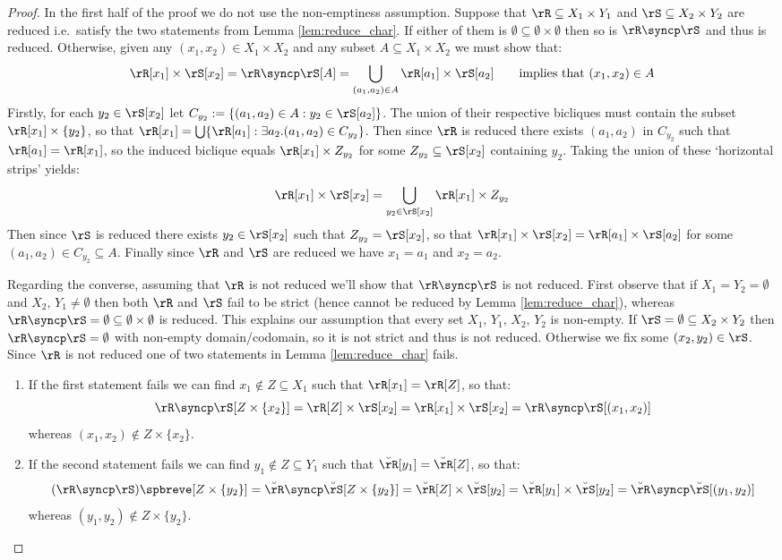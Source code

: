 \documentclass{article}
\begin{document}
\begin{proof}
In the first half of the proof we do not use the non-emptiness assumption. Suppose that $\rR \subseteq X_1 \times Y_1$ and $\rS \subseteq X_2 \times Y_2$ are reduced i.e.\ satisfy the two statements from Lemma \ref{lem:reduce_char}. If either of them is $\emptyset \subseteq \emptyset \times \emptyset$ then so is $\rR \syncp \rS$ and thus is reduced. Otherwise, given any $(x_1,x_2) \in X_1 \times X_2$ and any subset $A \subseteq X_1 \times X_2$ we must show that:
\[
\rR[x_1] \times \rS[x_2] = \rR \syncp \rS[A] = \bigcup_{(a_1,a_2) \in A} \rR[a_1] \times \rS[a_2]
\qquad
\text{implies that $(x_1,x_2) \in A$}
\]
Firstly, for each $y_2 \in \rS[x_2]$ let $C_{y_2} := \{ (a_1,a_2) \in A : y_2 \in \rS[a_2] \}$. The union of their respective bicliques must contain the subset $\rR[x_1] \times \{y_2\}$, so that $\rR[x_1] = \bigcup \{ \rR[a_1] : \exists a_2.(a_1,a_2) \in C_{y_2} \}$.  Then since $\rR$ is reduced there exists $(a_1,a_2)$ in $C_{y_2}$ such that $\rR[a_1] = \rR[x_1]$, so the induced biclique equals $\rR[x_1] \times Z_{y_2}$ for some $Z_{y_2} \subseteq \rS[x_2]$ containing $y_2$. Taking the union of these `horizontal strips' yields:
\[
\rR[x_1] \times \rS[x_2] 
= \bigcup_{y_2 \in \rS[x_2]} \rR[x_1] \times Z_{y_2}
\]
Then since $\rS$ is reduced there exists $y_2 \in \rS[x_2]$ such that $Z_{y_2} = \rS[x_2]$, so that $\rR[x_1] \times \rS[x_2] = \rR[a_1] \times \rS[a_2]$ for some $(a_1,a_2) \in C_{y_2} \subseteq A$. Finally since $\rR$ and $\rS$ are reduced we have $x_1 = a_1$ and $x_2 = a_2$. 

\smallskip
Regarding the converse, assuming that $\rR$ is not reduced we'll show that $\rR \syncp \rS$ is not reduced. First observe that if $X_1 = Y_2 = \emptyset$ and $X_2,\, Y_1 \neq \emptyset$ then both $\rR$ and $\rS$ fail to be strict (hence cannot be reduced by Lemma \ref{lem:reduce_char}), whereas $\rR \syncp \rS = \emptyset \subseteq \emptyset \times \emptyset$ is reduced. This explains our assumption that every set $X_1,\,Y_1,\,X_2,\,Y_2$ is non-empty. If $\rS = \emptyset \subseteq X_2 \times Y_2$ then $\rR \syncp \rS = \emptyset$ with non-empty domain/codomain, so it is not strict and thus is not reduced. Otherwise we fix some $(x_2,y_2) \in \rS$. Since $\rR$ is not reduced one of two statements in Lemma \ref{lem:reduce_char} fails.
\begin{enumerate}
\item
If the first statement fails we can find $x_1 \nin Z \subseteq X_1$ such that  $\rR[x_1] = \rR[Z]$, so that:
\[
\rR \syncp \rS[ Z \times \{x_2\}] 
= \rR[Z] \times \rS[x_2] 
= \rR[x_1] \times \rS[x_2] 
= \rR \syncp \rS[(x_1,x_2)]
\]
whereas $(x_1,x_2) \nin Z \times \{x_2\}$.
\item
If the second statement fails we can find $y_1 \nin Z \subseteq Y_1$ such that $\breve{\rR}[y_1] = \breve{\rR}[Z]$, so that:
\[
(\rR \syncp \rS)\spbreve[Z \times \{y_2\}]
= \breve{\rR} \syncp \breve{\rS}[Z \times \{y_2\}]
= \breve{\rR}[Z] \times \breve{\rS}[y_2]
= \breve{\rR}[y_1] \times \breve{\rS}[y_2]
= \breve{\rR} \syncp \breve{\rS}[(y_1,y_2)]
\]
whereas $(y_1,y_2) \nin Z \times \{y_2\}$.


\end{enumerate}
\end{proof}
\end{document}
